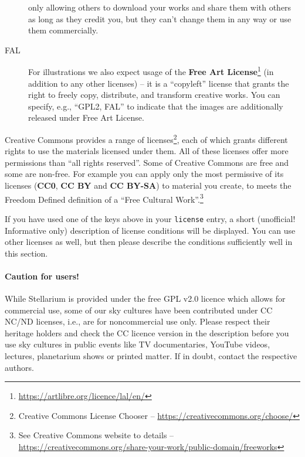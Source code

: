 \begin{description}
    only allowing others to download your works and share them with others as long as they credit you, but they can’t change them in any way or use them commercially.
  \item[FAL] For illustrations we also expect usage of the \textbf{Free Art License}\footnote{\url{https://artlibre.org/licence/lal/en/}} (in addition to any other licenses) --
    it is a ``copyleft'' license that grants the right to freely copy, distribute, and transform creative works. You can specify, e.g., ``GPL2, FAL'' to 
	indicate that the images are additionally released under Free Art License.
\end{description}

\noindent Creative Commons provides a range of licenses\footnote{Creative
  Commons License Chooser --
  \url{https://creativecommons.org/choose/}}, each of which grants
different rights to use the materials licensed under them. All of
these licenses offer more permissions than ``all rights
reserved''. Some of Creative Commons are free and some are
non-free. For example you can apply only the most permissive of its
licenses (\textbf{CC0}, \textbf{CC BY} and \textbf{CC BY-SA}) to
material you create, to meets the Freedom Defined definition of a
``Free Cultural Work''.\footnote{See Creative Commons website to
  details --
  \url{https://creativecommons.org/share-your-work/public-domain/freeworks}}

If you have used one of the keys above in your \texttt{license} entry,
a short (unofficial!  Informative only) description of license
conditions will be displayed. You can use other licenses as well, but
then please describe the conditions sufficiently well in this section.


\paragraph{Caution for users!} While Stellarium is provided under the free GPL v2.0 licence which allows for commercial use,
some of our sky cultures have been contributed under CC NC/ND licenses,
i.e., are for noncommercial use only.  Please respect their heritage
holders and check the CC licence version in the description before
you use sky cultures in public events like TV documentaries, YouTube
videos, lectures, planetarium shows or printed matter. If in doubt,
contact the respective authors.




